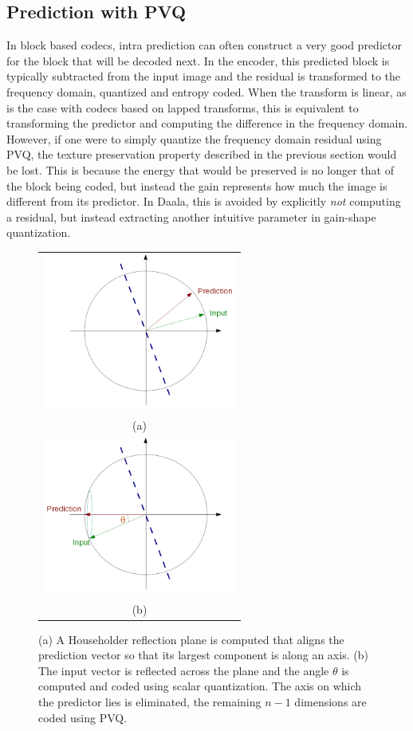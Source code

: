 \documentclass[conference, 10pt]{IEEEtran}
\begin{document}
\subsection{Prediction with PVQ}
\label{sec:pred}

In block based codecs, intra prediction can often construct a
 very good predictor for the block that will be decoded next.
In the encoder, this predicted block is typically subtracted from the input
 image and the residual is transformed to the frequency domain, quantized and
 entropy coded.
When the transform is linear, as is the case with codecs based on lapped
 transforms, this is equivalent to transforming the predictor and computing
 the difference in the frequency domain.
However, if one were to simply quantize the frequency domain residual using PVQ,
 the texture preservation property described in the previous section would be
 lost.
This is because the energy that would be preserved is no longer that of the
 block being coded, but instead the gain represents how much the image is
 different from its predictor.
In Daala, this is avoided by explicitly {\em not} computing a residual, but
 instead extracting another intuitive parameter in gain-shape quantization.

\begin{figure}
\begin{center}
\begin{tabular}{c}
  \includegraphics[natwidth=650,natheight=530,width=2.5in]{pvq_step3.png} \\
  (a) \\
  \includegraphics[natwidth=650,natheight=530,width=2.5in]{pvq_step6.png} \\
  (b)
\end{tabular}
\end{center}
\caption[pvq]{\label{fig:pvq} (a) A Householder reflection plane is computed
 that aligns the prediction vector so that its largest component is along an
 axis.  (b) The input vector is reflected across the plane and the angle
 $\theta$ is computed and coded using scalar quantization. The axis on which
 the predictor lies is eliminated, the remaining $n-1$ dimensions are coded
 using PVQ.}
\end{figure}
\end{document}
